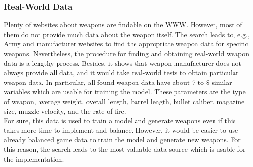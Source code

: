 \documentclass[MGS,Master,english]{twbook}%
\begin{document}
\subsubsection{Real-World Data}
Plenty of websites about weapons are findable on the \ac{WWW}. However, most of them do not provide much data about the weapon itself. The search leads to, e.g., Army and manufacturer websites to find the appropriate weapon data for specific weapons. Nevertheless, the procedure for finding and obtaining real-world weapon data is a lengthy process. Besides, it shows that weapon manufacturer does not always provide all data, and it would take real-world tests to obtain particular weapon data. In particular, all found weapon data have about 7 to 8 similar variables which are usable for training the model. These parameters are the type of weapon, average weight, overall length, barrel length, bullet caliber, magazine size, muzzle velocity, and the rate of fire.\\
For sure, this data is used to train a model and generate weapons even if this takes more time to implement and balance. However, it would be easier to use already balanced game data to train the model and generate new weapons. For this reason, the search leads to the most valuable data source which is usable for the implementation.
\end{document}
